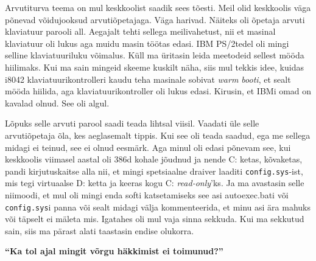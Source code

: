 Arvutiturva teema on mul keskkoolist saadik sees tõesti. Meil olid keskkoolis väga põnevad võidujooksud arvutiõpetajaga. Väga harivad. Näiteks oli õpetaja arvuti klaviatuur parooli all. Aegajalt tehti sellega meilivahetust, nii et masinal klaviatuur oli lukus aga muidu masin töötas edasi. IBM PS/2tedel oli mingi selline klaviatuuriluku võimalus. Küll ma üritasin leida meetodeid sellest mööda hiilimaks. Kui ma sain mingeid skeeme kuskilt näha, siis mul tekkis idee, kuidas i8042 klaviatuurikontrolleri kaudu teha masinale sobivat \emph{warm booti}, et sealt mööda hiilida, aga klaviatuurikontroller oli lukus edasi. Kirusin, et IBMi omad on kavalad olnud. See oli algul. 

Lõpuks selle arvuti parool saadi teada lihtsal viisil. Vaadati üle selle arvutiõpetaja õla, kes aeglasemalt tippis. Kui see oli teada saadud, ega me sellega midagi ei teinud, see ei olnud eesmärk. Aga minul oli edasi põnevam see, kui keskkoolis viimasel aastal oli 386d kohale jõudnud ja nende C: ketas, kõvaketas, pandi kirjutuskaitse alla nii, et mingi spetsiaalne draiver laaditi \verb|config.sys|-ist, mis tegi virtuaalse D: ketta ja keeras kogu C: \emph{read-only}'ks. Ja ma avastasin selle niimoodi, et mul oli mingi enda softi katsetamiseks see asi autoexec.bati või \verb|config.sys|i panna või sealt midagi välja kommenteerida, et minu asi ära mahuks või täpselt ei mäleta mis. Igatahes oli mul vaja sinna sekkuda. Kui ma sekkutud sain, siis ma pärast alati taastasin endise olukorra. 

\textbf{\enquote{Ka tol ajal mingit võrgu häkkimist ei toimunud?}}

